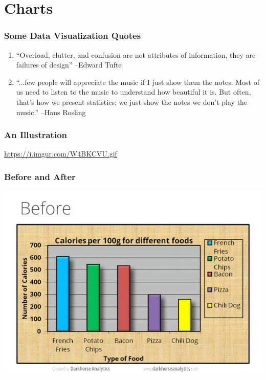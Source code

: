 \documentclass{beamer}
\begin{document}
\section{Charts}
\begin{frame}
\frametitle{Some Data Visualization Quotes}
	\begin{enumerate}
		\item ``Overload, clutter, and confusion are not attributes of information, they are failures 			of design'' --Edward Tufte
		
		\medskip
		
		\item ``...few people will appreciate the music if I just show them the notes. Most of us 				need to listen to the music to understand how beautiful it is. But often, that's how we 				present statistics; we just show the notes we don't play the music.'' --Hans Rosling
	\end{enumerate}
\end{frame}

\begin{frame}
\frametitle{An Illustration}
	\url{https://i.imgur.com/W4BKCVU.gif}	
\end{frame}

\begin{frame}
\frametitle{Before and After}
	\includegraphics[width = \textwidth]{./images/designBefore.png}
\end{frame}
\end{document}
